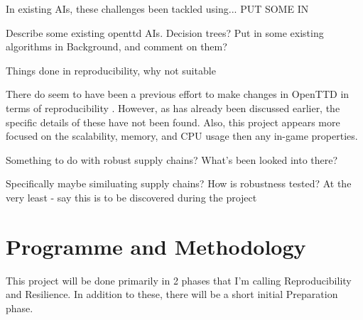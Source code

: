\documentclass[a4paper,11pt]{article}
\begin{document}
In existing AIs, these challenges been tackled using... PUT SOME IN

Describe some existing openttd AIs. Decision trees? Put in some existing algorithms in Background, and comment on them?

Things done in reproducibility, why not suitable

There do seem to have been a previous effort to make changes in OpenTTD in terms of reproducibility \cite{shen_rtsenv_2011}. However, as has already been discussed earlier, the specific details of these have not been found. Also, this project appears more focused on the scalability, memory, and CPU usage then any in-game properties.

Something to do with robust supply chains? What's been looked into there?

Specifically maybe similuating supply chains? How is robustness tested? At the very least - say this is to be discovered during the project

\section{Programme and Methodology}

This project will be done primarily in 2 phases that I'm calling Reproducibility and Resilience. In addition to these, there will be a short initial Preparation phase.
\end{document}
